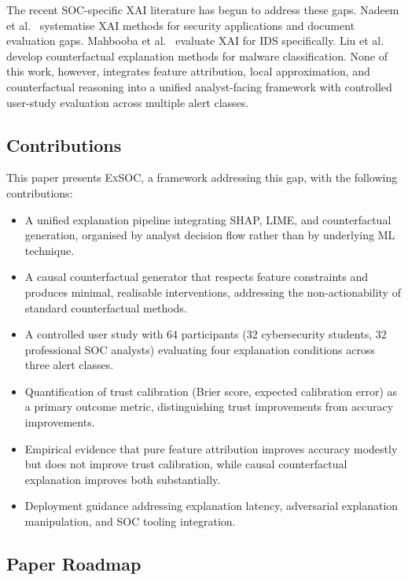 \documentclass[sigconf,nonacm]{acmart}
\begin{document}
The recent SOC-specific XAI literature has begun to address these gaps.
Nadeem et al.~\cite{nadeem2023sok} systematise XAI methods for security
applications and document evaluation gaps. Mahbooba et al.~\cite{mahbooba2023}
evaluate XAI for IDS specifically. Liu et al.~\cite{liu2024xai} develop
counterfactual explanation methods for malware classification. None of this
work, however, integrates feature attribution, local approximation, and
counterfactual reasoning into a unified analyst-facing framework with
controlled user-study evaluation across multiple alert classes.

\subsection{Contributions}

This paper presents \textsc{ExSOC}, a framework addressing this gap, with
the following contributions:

\begin{itemize}
  \item A unified explanation pipeline integrating SHAP, LIME, and
        counterfactual generation, organised by analyst decision flow rather
        than by underlying ML technique.
  \item A causal counterfactual generator that respects feature constraints
        and produces minimal, realisable interventions, addressing the
        non-actionability of standard counterfactual methods.
  \item A controlled user study with 64 participants (32 cybersecurity
        students, 32 professional SOC analysts) evaluating four explanation
        conditions across three alert classes.
  \item Quantification of trust calibration (Brier score, expected
        calibration error) as a primary outcome metric, distinguishing trust
        improvements from accuracy improvements.
  \item Empirical evidence that pure feature attribution improves accuracy
        modestly but does not improve trust calibration, while causal
        counterfactual explanation improves both substantially.
  \item Deployment guidance addressing explanation latency, adversarial
        explanation manipulation, and SOC tooling integration.
\end{itemize}

\subsection{Paper Roadmap}
\end{document}
